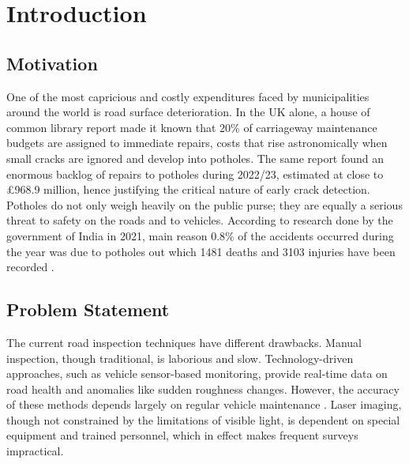 \chapter{Introduction}

\section{Motivation}
One of the most capricious and costly expenditures faced by municipalities around the world is road surface deterioration. In the UK alone, a house of common library report made it known that 20\% of carriageway maintenance budgets are assigned to immediate repairs, costs that rise astronomically when small cracks are ignored and develop into potholes\cite{stewart2024potholes}. The same report found an enormous backlog of repairs to potholes during 2022/23, estimated at close to £968.9 million, hence justifying the critical nature of early crack detection\cite{stewart2024potholes}. Potholes do not only weigh heavily on the public purse; they are equally a serious threat to safety on the roads and to vehicles. According to research done by the government of India in 2021, main reason 0.8\% of the accidents occurred during the year was due to potholes out which 1481 deaths and 3103 injuries have been recorded \cite{government}.
\section{Problem Statement}
The current road inspection techniques have different drawbacks. Manual inspection, though traditional, is laborious and slow. Technology-driven approaches, such as vehicle sensor-based monitoring, provide real-time data on road health and anomalies like sudden roughness changes. However, the accuracy of these methods depends largely on regular vehicle maintenance \cite{bmwpaper}. Laser imaging, though not constrained by the limitations of visible light, is dependent on special equipment and trained personnel, which in effect makes frequent surveys impractical\cite{yu2011}.

